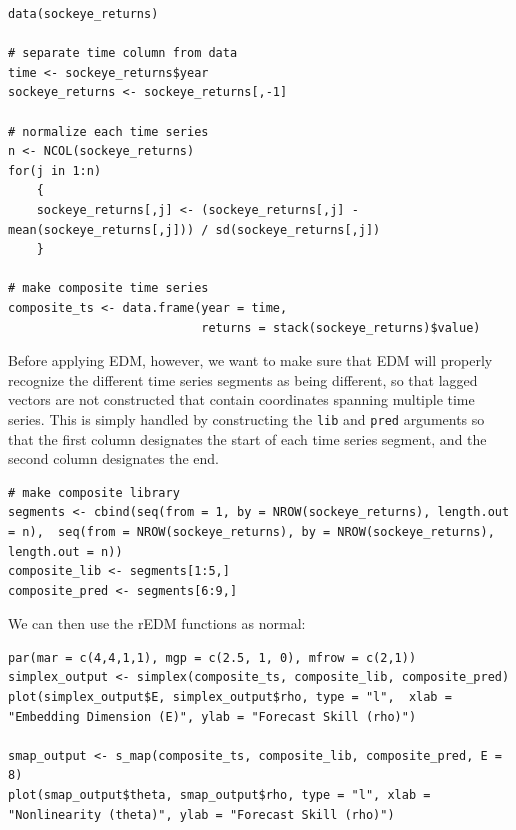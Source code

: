 \begin{lstlisting}
data(sockeye_returns)

# separate time column from data
time <- sockeye_returns$year
sockeye_returns <- sockeye_returns[,-1]

# normalize each time series
n <- NCOL(sockeye_returns)
for(j in 1:n)
    {
    sockeye_returns[,j] <- (sockeye_returns[,j] - mean(sockeye_returns[,j])) / sd(sockeye_returns[,j])
    }

# make composite time series
composite_ts <- data.frame(year = time, 
                           returns = stack(sockeye_returns)$value)
\end{lstlisting}

Before applying EDM, however, we want to make sure that EDM will properly recognize the different time series segments as being different, so that lagged vectors are not constructed that contain coordinates spanning multiple time series. This is simply handled by constructing the \lstinline{lib} and \lstinline{pred} arguments so that the first column designates the start of each time series segment, and the second column designates the end.

\begin{lstlisting}
# make composite library
segments <- cbind(seq(from = 1, by = NROW(sockeye_returns), length.out = n),  seq(from = NROW(sockeye_returns), by = NROW(sockeye_returns), length.out = n))
composite_lib <- segments[1:5,]
composite_pred <- segments[6:9,]
\end{lstlisting}

We can then use the rEDM functions as normal:

\begin{lstlisting}
par(mar = c(4,4,1,1), mgp = c(2.5, 1, 0), mfrow = c(2,1))
simplex_output <- simplex(composite_ts, composite_lib, composite_pred)
plot(simplex_output$E, simplex_output$rho, type = "l",  xlab = "Embedding Dimension (E)", ylab = "Forecast Skill (rho)")

smap_output <- s_map(composite_ts, composite_lib, composite_pred, E = 8)
plot(smap_output$theta, smap_output$rho, type = "l", xlab = "Nonlinearity (theta)", ylab = "Forecast Skill (rho)")
\end{lstlisting}

